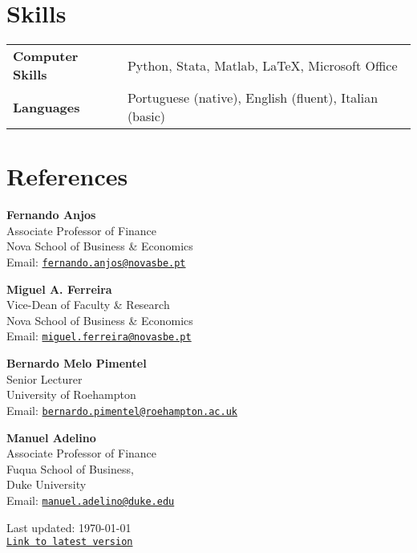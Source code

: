 \documentclass[letterpaper]{article}
\def\footerlink{https://miguelcfoliveira.github.io/CV/CV.pdf}
\begin{document}
\section*{Skills}
\renewcommand{\arraystretch}{1.25}
\begin{table}[h]
 \vspace*{-\baselineskip}
\begin{tabular}{l l}
\textbf{Computer Skills} & Python, Stata, Matlab, \LaTeX, Microsoft Office \\
\textbf{Languages} & Portuguese (native), English (fluent), Italian (basic)
\end{tabular}
\end{table}


\section*{References}
\begin{multicols}{2}
\textbf{Fernando Anjos} \\
Associate Professor of Finance \\
Nova School of Business \& Economics \\
Email: \href{mailto:fernando.anjos@novasbe.pt}{\tt fernando.anjos@novasbe.pt} 
\columnbreak \hfill

\textbf{Miguel A. Ferreira} \\
Vice-Dean of Faculty \& Research \\
Nova School of Business \& Economics \\
Email: \href{mailto:miguel.ferreira@novasbe.pt}{\tt miguel.ferreira@novasbe.pt} 
\end{multicols}

\begin{multicols}{2}
\textbf{Bernardo Melo Pimentel} \\
Senior Lecturer \\
University of Roehampton\\
Email: \href{mailto:bernardo.pimentel@roehampton.ac.uk}{\tt bernardo.pimentel@roehampton.ac.uk} 
\columnbreak \hfill

\textbf{Manuel Adelino} \\
Associate Professor of Finance \\
Fuqua School of Business, \\ 
Duke University \\
Email: \href{mailto:manuel.adelino@duke.edu}{\tt manuel.adelino@duke.edu} 
\end{multicols}

\bigskip

\begin{center}
  \begin{footnotesize}
    Last updated: \today \\
    \href{\footerlink}{\texttt{Link to latest version}}
  \end{footnotesize}
\end{center}
\end{document}
